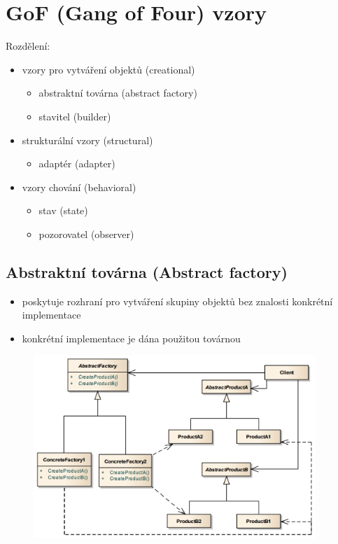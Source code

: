 \documentclass{szzclass}
\begin{document}
\section{GoF (Gang of Four) vzory}
Rozdělení:
\begin{itemize}
    \item vzory pro vytváření objektů (creational)
    \begin{itemize}
        \item abstraktní továrna (abstract factory)
        \item stavitel (builder)
    \end{itemize}
    \item strukturální vzory (structural)
    \begin{itemize}
        \item adaptér (adapter)
    \end{itemize}
    \item vzory chování (behavioral)
    \begin{itemize}
        \item stav (state)
        \item pozorovatel (observer)
    \end{itemize}
\end{itemize}
\subsection{Abstraktní továrna (Abstract factory)}
\begin{itemize}
    \item poskytuje rozhraní pro vytváření skupiny objektů bez znalosti konkrétní implementace
    \item konkrétní implementace je dána použitou továrnou
\end{itemize}
\begin{figure}[h!]
    \includegraphics[width=0.95\textwidth]{topics/bi-wsi-si-19/images/abstractFactory.png}
\end{figure}
\end{document}
